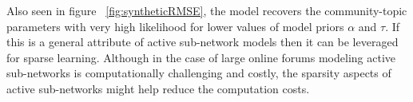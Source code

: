 \documentclass{sig-alternate}
\begin{document}
Also
seen in figure ~\ref{fig:syntheticRMSE}, the model recovers the
community-topic parameters with very high likelihood for lower values of model
priors $\alpha$ and $\tau$. If this is a general attribute of active sub-network
models then it can be leveraged for sparse learning. Although in the case
of large online forums modeling active sub-networks is computationally
challenging and costly, the sparsity aspects of active sub-networks might help
reduce the computation costs.




\appendix

\end{document}
